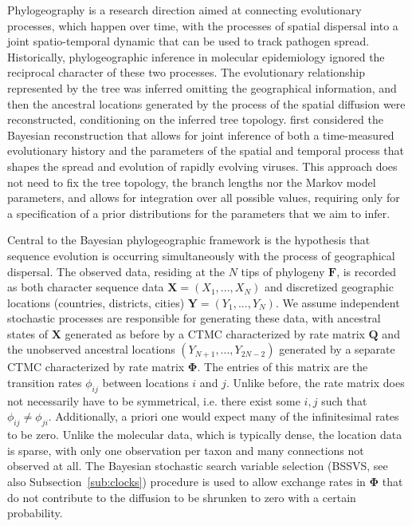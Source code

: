 Phylogeography is a research direction aimed at connecting evolutionary processes, which happen over time, with the processes of spatial dispersal into a joint spatio-temporal dynamic that can be used to track pathogen spread.
Historically, phylogeographic inference in molecular epidemiology ignored the reciprocal character of these two processes. 
The evolutionary relationship represented by the tree was inferred omitting the geographical information, and then the ancestral locations generated by the process of the spatial diffusion were reconstructed, conditioning on the inferred tree topology.
\citet{Lemey2009} first considered the Bayesian reconstruction that allows for joint inference of both a time-measured evolutionary history and the parameters of the spatial and temporal process that shapes the spread and evolution of 
rapidly evolving viruses.
This approach does not need to fix the tree topology, the branch lengths nor the Markov model parameters, and allows for integration over all possible values, requiring only for a specification of a prior distributions for the parameters that we aim to infer.

Central to the Bayesian phylogeographic framework is the hypothesis that sequence evolution is occurring simultaneously with the process of geographical dispersal. 
The observed data, residing at the $N$ tips of phylogeny $\mathbf{F}$, is recorded as both character sequence data $\mathbf{X}=(X_{1},...,X_{N})$ and discretized geographic locations (countries, districts, cities) $\mathbf{Y}=(Y_{1},...,Y_{N})$.
We assume independent stochastic processes are responsible for generating these data, with ancestral states of $\mathbf{X}$ generated as before by a CTMC characterized by rate matrix $\mathbf{Q}$ and the unobserved ancestral locations $(Y_{N+1},...,Y_{2N-2})$ generated by a separate CTMC characterized by rate matrix $\mathbf{\Phi}$.
The entries of this matrix are the transition rates $\phi_{ij}$ between locations $i$ and $j$.
Unlike before, the rate matrix does not necessarily have to be symmetrical, i.e. there exist some $i,j$ such that $\phi_{ij}\neq\phi_{ji}$.
Additionally, a priori one would expect many of the infinitesimal rates to be zero. 
Unlike the molecular data, which is typically dense, the location data is sparse, with only one observation per taxon and many connections not observed at all.
The Bayesian stochastic search variable selection (BSSVS, see also Subsection~\ref{sub:clocks}) procedure is used to allow exchange rates in $\mathbf{\Phi}$ that do not contribute to the diffusion to be shrunken to zero with a certain probability.

